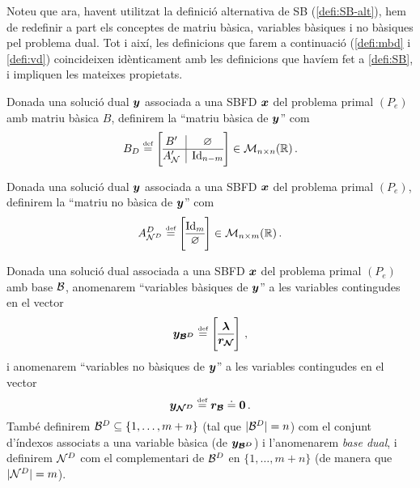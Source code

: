 Noteu que ara, havent utilitzat la definició alternativa de SB 
(\ref{defi:SB-alt}), hem de redefinir a part els conceptes de matriu bàsica, 
variables bàsiques i no bàsiques pel problema dual. Tot i així, les definicions 
que farem a continuació (\ref{defi:mbd} i \ref{defi:vd}) coincideixen 
idènticament amb les definicions que havíem fet a \ref{defi:SB}, i impliquen 
les mateixes propietats.

\begin{defi}\label{defi:mbd}
	Donada una solució dual $\boldsymbol{y}$ associada a una SBFD $\boldsymbol{x}$ del problema 
	primal $(P_e)$ amb matriu bàsica $B$, definirem la ``matriu bàsica de 
	$\boldsymbol{y}$'' com
	\[
	B_D \defeq \left[
	\begin{array}{@{}c|c@{}}
	B'	  &	\varnothing	\\
	\hline
	A_\N' & \Id_{n-m}
	\end{array}
	\right]
	\in \matspace_{n\times n}(\real)  \,.
	\]
\end{defi}

\begin{defi}
	Donada una solució dual $\boldsymbol{y}$ associada a una SBFD $\boldsymbol{x}$ del problema 
	primal $(P_e)$, definirem la ``matriu no bàsica de  $\boldsymbol{y}$'' com
	\[
	A^D_{\N^D} \defeq 
	\left[
	\begin{array}{@{}c@{}}
	\Id_m \\
	\hline
	\varnothing
	\end{array}
	\right]
	\in \matspace_{n\times m}(\real)\,.
	\]
\end{defi}

\begin{defi}\label{defi:vd}
	Donada una solució dual associada a una SBFD $\boldsymbol{x}$ del problema primal 
	$(P_e)$ amb base $\mathcal{B}$, anomenarem ``variables bàsiques de $\boldsymbol{y}$'' a les 
	variables contingudes en el vector
	\[
	\vb{y_{\B^D}} \defeq
	\left[\begin{array}{@{}c@{}}
	\vb{\lambda}\\
	\hline
	\vb{r_\N}
	\end{array}\right]\,,
	\]
	i anomenarem ``variables no bàsiques de $\boldsymbol{y}$'' a les variables 
	contingudes en el vector
	\[
	\boldsymbol{y_{\mathcal{N}^D}} \stackrel{\text{\tiny def}}{=} \boldsymbol{r_{\mathcal{B}}} \doteq \boldsymbol{0}\,.
	\]
	També definirem $\mathcal{B}^D \subseteq \{1,\ldots, m+n\}$ (tal que $|\mathcal{B}^D| = n$) 
	com el conjunt d'índexos associats a una variable bàsica (de 
	$\boldsymbol{y_{\mathcal{B}^D}}$) i l'anomenarem \textit{base dual}, i definirem $\mathcal{N}^D$ com 
	el complementari de $\mathcal{B}^D$ en $\{1,\ldots,m+n\}$ (de manera que $|\mathcal{N}^D|=m$).
\end{defi}

